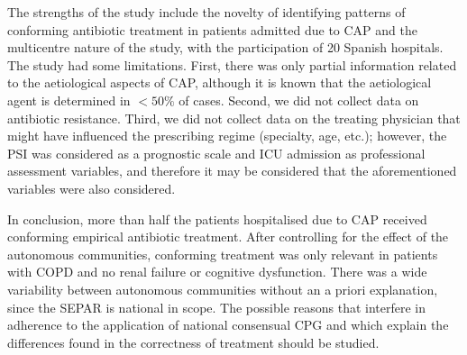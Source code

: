 \documentclass[11pt, a4paper]{article}
\begin{document}
\begin{multicols}{2}
The strengths of the study include the novelty of identifying patterns of conforming antibiotic treatment in patients admitted due to CAP and the multicentre nature of the study, with the participation of 20 Spanish hospitals. The study had some limitations. First, there was only partial information related to the aetiological aspects of CAP, although it is known that the aetiological agent is determined in $<50\%$ of cases. Second, we did not collect data on antibiotic resistance. Third, we did not collect data on the treating physician that might have influenced the prescribing regime (specialty, age, etc.); however, the PSI was considered as a prognostic scale \cite{menendez2010neumonia} and ICU admission as professional assessment variables, and therefore it may be considered that the aforementioned variables were also considered.

In conclusion, more than half the patients hospitalised due to CAP received conforming empirical antibiotic treatment. After controlling for the effect of the autonomous communities, conforming treatment was only relevant in patients with COPD and no renal failure or cognitive dysfunction. There was a wide variability between autonomous communities without an a priori explanation, since the SEPAR is national in scope. The possible reasons that interfere in adherence to the application of national consensual CPG and which explain the differences found in the correctness of treatment should be studied.

\end{multicols}




\end{document}

